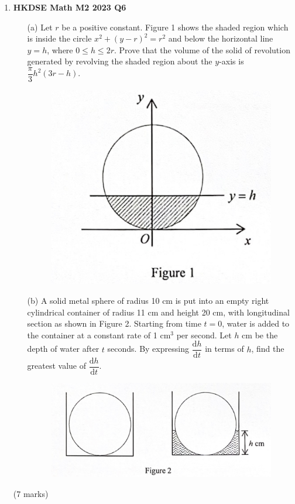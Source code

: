 \documentclass{report}
\begin{document}
\begin{enumerate}
	\item \textbf{HKDSE Math M2 2023 Q6}
	\begin{enumerate}
		\item [(a)]Let $r$ be a positive constant. Figure 1 shows the shaded region which is inside the circle $x^2 + (y-r)^2 = r^2$ and below the horizontal line $y = h$, where $0 \leq h \leq 2r$. Prove that the volume of the solid of revolution generated by revolving the shaded region about the $y$-axis is $\dfrac{\pi}{3}h^2(3r-h)$.
		\begin{figure}[H]
			\centering
			\includegraphics[width = .5\linewidth]{2023Figure1}
		\end{figure}
		\item [(b)]A solid metal sphere of radius 10 cm is put into an empty right cylindrical container of radius 11 cm and height 20 cm, with longitudinal section as shown in Figure 2. Starting from time $t=0$, water is added to the container at a constant rate of 1 cm$^3$ per second. Let $h$ cm be the depth of water after $t$ seconds. By expressing $\dfrac{\text{d}h}{\text{d}t}$ in terms of $h$, find the greatest value of $\dfrac{\text{d}h}{\text{d}t}$.
		\begin{figure}[H]
			\centering
			\includegraphics[width = .5\linewidth]{2023Figure2}
		\end{figure}
	\end{enumerate}
	(7 marks)


\end{enumerate}
\end{document}
